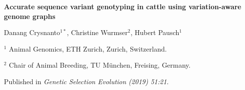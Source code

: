 \documentclass[../main.tex]{subfiles}
\begin{document}
\fi


\graphicspath{{figure/}{../figure/}}

\onehalfspacing

\begin{center}
\LARGE\bf{Accurate sequence variant genotyping in cattle using variation-aware genome graphs}
\end{center}

\bigskip
\large{Danang Crysnanto$^{1*}$, Christine Wurmser$^{2}$, Hubert Pausch$^{1}$}

\bigskip 


\normalsize
$^1$ Animal Genomics, ETH Zurich, Zurich, Switzerland. 

$^2$ Chair of Animal Breeding, TU München, Freising, Germany. 

\vspace{2 cm}

\vspace{5 cm}

\bigskip
\large Published in \emph{Genetic Selection Evolution (2019) 51:21.}

\normalsize
\newpage
\end{document}
